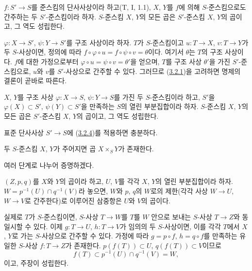 \begin{proposition}[3.2.4]
\label{I.3.2.4-ko}
$f:S'\to S$를 준스킴의 단사사상이라 하고(T, I, 1.1), $X$, $Y$를
$f$에 의해 $S$-준스킴으로도 간주하는 두 $S'$-준스킴이라 하자.
$S$-준스킴 $X$, $Y$의 모든 곱은 $S'$-준스킴 $X$, $Y$의 곱이고,
그 역도 성립한다.
\end{proposition}

$\varphi:X\to S'$, $\psi:Y\to S'$를 구조 사상이라 하자. $T$가
$S$-준스킴이고 $u:T\to X$, $v:T\to Y$가 두 $S$-사상이면, 정의에
따라 $f\circ\varphi\circ u=f\circ\psi\circ v=\theta$이다. 여기서
$\theta$는 $T$의 구조 사상이다. $f$에 대한 가정으로부터
$\varphi\circ u=\psi\circ v=\theta'$을 얻으며, $T$를 구조 사상
$\theta'$을 가진 $S'$-준스킴으로, $u$와 $v$를 $S'$-사상으로 간주할
수 있다. 그러므로 (\hyperref[I.3.2.1-ko]{3.2.1})을 고려하면 명제의
결론이 곧바로 따른다.

\begin{corollary}[3.2.5]
\label{I.3.2.5-ko}
$X$, $Y$를 구조 사상 $\varphi:X\to S$, $\psi:Y\to S$를 가진 두
$S$-준스킴이라 하고, $S'$을 $\varphi(X)\subset S'$,
$\psi(Y)\subset S'$을 만족하는 $S$의 열린 부분집합이라 하자.
$S$-준스킴 $X$, $Y$의 모든 곱은 $S'$-준스킴 $X$, $Y$의 곱이고,
그 역도 성립한다.
\end{corollary}

표준 단사사상 $S'\to S$에 (\hyperref[I.3.2.4-ko]{3.2.4})를
적용하면 충분하다.

\begin{theorem}[3.2.6]
\label{I.3.2.6-ko}
두 $S$-준스킴 $X$, $Y$가 주어지면 곱 $X\times_S Y$가 존재한다.
\end{theorem}

여러 단계로 나누어 증명하겠다.

\begin{lemma}[3.2.6.1]
\label{I.3.2.6.1-ko}
$(Z,p,q)$를 $X$와 $Y$의 곱이라 하고, $U$, $V$를 각각 $X$, $Y$의
열린 부분집합이라 하자. $W=p^{-1}(U)\cap q^{-1}(V)$라 놓으면,
$W$와 $p$, $q$의 $W$로의 제한(각각 사상 $W\to U$, $W\to V$로
간주한다)로 이루어진 삼중항은 $U$와 $V$의 곱이다.
\end{lemma}

실제로 $T$가 $S$-준스킴이면, $S$-사상 $T\to W$를 $T$를 $W$ 안으로
보내는 $S$-사상 $T\to Z$와 동일시할 수 있다. 이제 $g:T\to U$,
$h:T\to V$가 임의의 두 $S$-사상이면, 이를 각각 $T$에서 $X$, $Y$로
가는 $S$-사상으로 간주할 수 있다. 가정에 따라 $g=p\circ f$,
$h=q\circ f$를 만족하는 유일한 $S$-사상 $f:T\to Z$가 존재한다.
$p(f(T))\subset U$, $q(f(T))\subset V$이므로
\[
  f(T)\subset p^{-1}(U)\cap q^{-1}(V)=W,
\]
이고, 주장이 성립한다.

